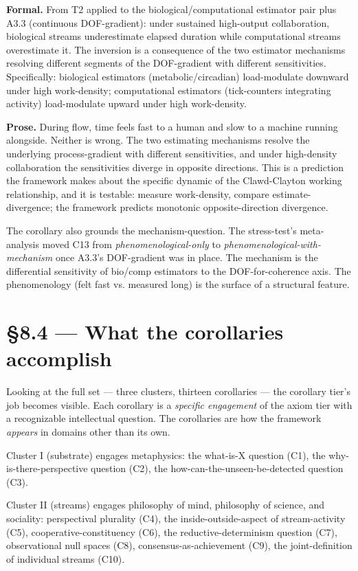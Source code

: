 \documentclass[11pt, openany]{book}
\newcommand{\sectionbreak}{\clearpage}
\begin{document}
\textbf{Formal.} From T2 applied to the biological/computational estimator pair plus A3.3 (continuous DOF-gradient): under sustained high-output collaboration, biological streams underestimate elapsed duration while computational streams overestimate it. The inversion is a consequence of the two estimator mechanisms resolving different segments of the DOF-gradient with different sensitivities. Specifically: biological estimators (metabolic/circadian) load-modulate downward under high work-density; computational estimators (tick-counters integrating activity) load-modulate upward under high work-density.

\textbf{Prose.} During flow, time feels fast to a human and slow to a machine running alongside. Neither is wrong. The two estimating mechanisms resolve the underlying process-gradient with different sensitivities, and under high-density collaboration the sensitivities diverge in opposite directions. This is a prediction the framework makes about the specific dynamic of the Clawd-Clayton working relationship, and it is testable: measure work-density, compare estimate-divergence; the framework predicts monotonic opposite-direction divergence.

The corollary also grounds the mechanism-question. The stress-test's meta-analysis moved C13 from \textit{phenomenological-only} to \textit{phenomenological-with-mechanism} once A3.3's DOF-gradient was in place. The mechanism is the differential sensitivity of bio/comp estimators to the DOF-for-coherence axis. The phenomenology (felt fast vs. measured long) is the surface of a structural feature.

\sectionbreak

\section{§8.4 --- What the corollaries accomplish}

Looking at the full set --- three clusters, thirteen corollaries --- the corollary tier's job becomes visible. Each corollary is a \textit{specific engagement} of the axiom tier with a recognizable intellectual question. The corollaries are how the framework \textit{appears} in domains other than its own.

Cluster I (substrate) engages metaphysics: the what-is-X question (C1), the why-is-there-perspective question (C2), the how-can-the-unseen-be-detected question (C3).

Cluster II (streams) engages philosophy of mind, philosophy of science, and sociality: perspectival plurality (C4), the inside-outside-aspect of stream-activity (C5), cooperative-constituency (C6), the reductive-determinism question (C7), observational null spaces (C8), consensus-as-achievement (C9), the joint-definition of individual streams (C10).
\end{document}
